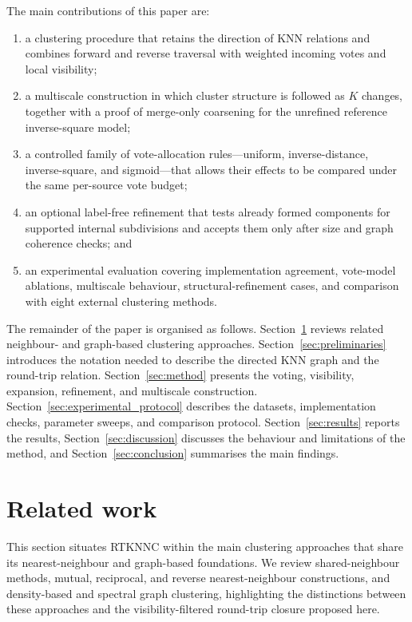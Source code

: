 \documentclass[review,12pt]{elsarticle}
\begin{document}
The main contributions of this paper are:
\begin{enumerate}
\item a clustering procedure that retains the direction of KNN relations and
combines forward and reverse traversal with weighted incoming votes and local
visibility;
\item a multiscale construction in which cluster structure is followed as $K$
changes, together with a proof of merge-only coarsening for the unrefined
reference inverse-square model;
\item a controlled family of vote-allocation rules---uniform,
inverse-distance, inverse-square, and sigmoid---that allows their effects to be
compared under the same per-source vote budget;
\item an optional label-free refinement that tests already formed components for
supported internal subdivisions and accepts them only after size and graph
coherence checks; and
\item an experimental evaluation covering implementation agreement, vote-model
ablations, multiscale behaviour, structural-refinement cases, and comparison
with eight external clustering methods.
\end{enumerate}

The remainder of the paper is organised as follows. Section~\ref{sec:related}
reviews related neighbour- and graph-based clustering approaches.
Section~\ref{sec:preliminaries} introduces the notation needed to describe the
directed KNN graph and the round-trip relation. Section~\ref{sec:method} presents
the voting, visibility, expansion, refinement, and multiscale construction.
Section~\ref{sec:experimental_protocol} describes the datasets, implementation
checks, parameter sweeps, and comparison protocol. Section~\ref{sec:results}
reports the results, Section~\ref{sec:discussion} discusses the behaviour and
limitations of the method, and Section~\ref{sec:conclusion} summarises the main
findings.

\section{Related work}\label{sec:related}

This section situates RTKNNC within the main clustering approaches that share its nearest-neighbour and graph-based foundations. We review shared-neighbour methods, mutual, reciprocal, and reverse nearest-neighbour constructions, and density-based and spectral graph clustering, highlighting the distinctions between these approaches and the visibility-filtered round-trip closure proposed here.
\end{document}
